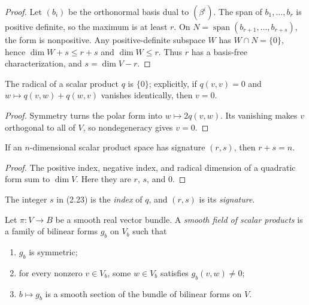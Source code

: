 \begin{proof}
\leanok
{}
\sketch Let $(b_i)$ be the orthonormal basis dual to $(\beta^i)$. The span of
$b_1,\ldots,b_r$ is positive definite, so the maximum is at least $r$. On
$N=\operatorname{span}(b_{r+1},\ldots,b_{r+s})$, the form is nonpositive. Any
positive-definite subspace $W$ has $W\cap N=\{0\}$, hence
$\dim W+s\leq r+s$ and $\dim W\leq r$. Thus $r$ has a basis-free
characterization, and $s=\dim V-r$.
\end{proof}

\begin{lemma}
\label{lem:radical-scalar-product-trivial}
\leanok
{}
The radical of a scalar product $q$ is $\{0\}$; explicitly, if $q(v,v)=0$ and
$w\mapsto q(v,w)+q(w,v)$ vanishes identically, then $v=0$.
\end{lemma}

\begin{proof}
\leanok
{}
\sketch Symmetry turns the polar form into $w\mapsto2q(v,w)$. Its vanishing makes
$v$ orthogonal to all of $V$, so nondegeneracy gives $v=0$.
\end{proof}

\begin{corollary}[$r + s = n$, without a basis]
\label{cor:scalar-product-signature-sum}
\leanok
{}
If an $n$-dimensional scalar product space has signature $(r,s)$, then
$r+s=n$.
\end{corollary}

\begin{proof}
\leanok
{}
\sketch The positive index, negative index, and radical dimension of a quadratic
form sum to $\dim V$. Here they are $r$, $s$, and $0$.
\end{proof}

The integer $s$ in (2.23) is the \emph{index} of $q$, and $(r,s)$ is its
\emph{signature}.

\begin{definition}
\label{def:smooth-field-scalar-products}
\leanok
{}
Let $\pi\colon V\to B$ be a smooth real vector bundle. A \emph{smooth field of
scalar products} is a family of bilinear forms $g_b$ on $V_b$ such that
\begin{enumerate}[label=(\alph*)]
\item $g_b$ is symmetric;
\item for every nonzero $v\in V_b$, some $w\in V_b$ satisfies $g_b(v,w)\ne0$;
\item $b\mapsto g_b$ is a smooth section of the bundle of bilinear forms on $V$.
\end{enumerate}
\end{definition}


